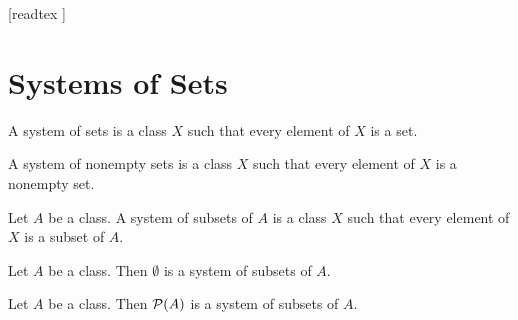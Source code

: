 \documentclass[10pt]{article}
\begin{document}
  \begin{imports}
    \begin{forthel}
      [readtex ]
    \end{forthel}
  \end{imports}


  \section*{Systems of Sets}

  \begin{forthel}
    \begin{definition}[id=FOUNDATIONS_10_5805323570905088,printid]
      A system of sets is a class $X$ such that every element of $X$ is a set.
    \end{definition}
  \end{forthel}

  \begin{forthel}
    \begin{definition}[id=FOUNDATIONS_10_1631952387964928,printid]
      A system of nonempty sets is a class $X$ such that every element of $X$ is a nonempty set.
    \end{definition}
  \end{forthel}

  \begin{forthel}
    \begin{definition}[id=FOUNDATIONS_10_943381479948288,printid]
      Let $A$ be a class.
      A system of subsets of $A$ is a class $X$ such that every element of $X$ is a subset of $A$.
    \end{definition}
  \end{forthel}

  \begin{forthel}
    \begin{proposition}[id=FOUNDATIONS_10_8268633648136192,printid]
      Let $A$ be a class.
      Then $\emptyset$ is a system of subsets of $A$.
    \end{proposition}
  \end{forthel}

  \begin{forthel}
    \begin{proposition}[id=FOUNDATIONS_10_7546016869908480,printid]
      Let $A$ be a class.
      Then $\mathcal{P}(A)$ is a system of subsets of $A$.
    \end{proposition}
  \end{forthel}
\end{document}
